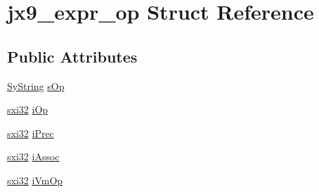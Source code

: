 \hypertarget{structjx9__expr__op}{\section{jx9\-\_\-expr\-\_\-op Struct Reference}
\label{df/d8d/structjx9__expr__op}
}
\subsection*{Public Attributes}
\begin{DoxyCompactItemize}
\item 
\hyperlink{struct_sy_string}{Sy\-String} \hyperlink{structjx9__expr__op_ad8619d416929a84273ef46003660f483}{s\-Op}
\item 
\hyperlink{unqlite_8c_a5a58035d4ae379178e2ca46cc3272fc5}{sxi32} \hyperlink{structjx9__expr__op_a0f55fa42afc89e69299983e26b709aa5}{i\-Op}
\item 
\hyperlink{unqlite_8c_a5a58035d4ae379178e2ca46cc3272fc5}{sxi32} \hyperlink{structjx9__expr__op_af398985e17e482e76a7ab41a4d4428a4}{i\-Prec}
\item 
\hyperlink{unqlite_8c_a5a58035d4ae379178e2ca46cc3272fc5}{sxi32} \hyperlink{structjx9__expr__op_ace452d5263e0e93220b8b7a5e535a6ee}{i\-Assoc}
\item 
\hyperlink{unqlite_8c_a5a58035d4ae379178e2ca46cc3272fc5}{sxi32} \hyperlink{structjx9__expr__op_a99154bc7454f19103498a99f5a810ace}{i\-Vm\-Op}
\end{DoxyCompactItemize}


